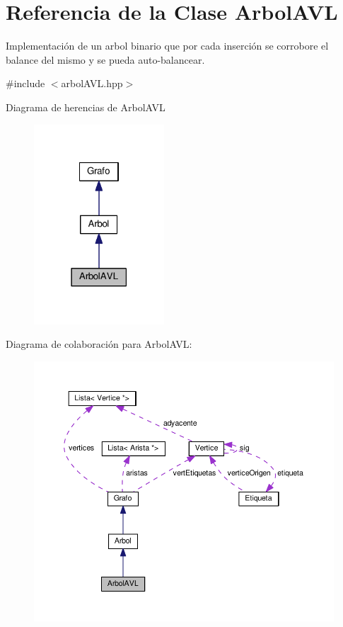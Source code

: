 \hypertarget{classArbolAVL}{}\section{Referencia de la Clase Arbol\+A\+VL}
\label{classArbolAVL}


Implementación de un arbol binario que por cada inserción se corrobore el balance del mismo y se pueda auto-\/balancear.  




{\ttfamily \#include $<$arbol\+A\+V\+L.\+hpp$>$}



Diagrama de herencias de Arbol\+A\+VL\nopagebreak
\begin{figure}[H]
\begin{center}
\leavevmode
\includegraphics[width=138pt]{classArbolAVL__inherit__graph}
\end{center}
\end{figure}


Diagrama de colaboración para Arbol\+A\+VL\+:\nopagebreak
\begin{figure}[H]
\begin{center}
\leavevmode
\includegraphics[width=350pt]{classArbolAVL__coll__graph}
\end{center}
\end{figure}
